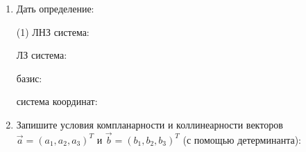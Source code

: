 \begin{enumerate}
    \item Дать определение:
    \begin{tasks}(1)
        \task ЛНЗ система:\ \hrulefill\par\hrulefill\par\hrulefill
        \task ЛЗ система:\ \hrulefill\par\hrulefill\par\hrulefill
        \task базис:\ \hrulefill\par\hrulefill\par\hrulefill\par\hrulefill
        \task система координат:\ \hrulefill\par\hrulefill\par\hrulefill
    \end{tasks}
    
    \item Запишите условия компланарности и коллинеарности векторов $\vec a = (a_1, a_2, a_3)^T$ и $\vec b = (b_1, b_2, b_3)^T$ (с помощью детерминанта):
    \vspace{5cm}
    

\end{enumerate}
